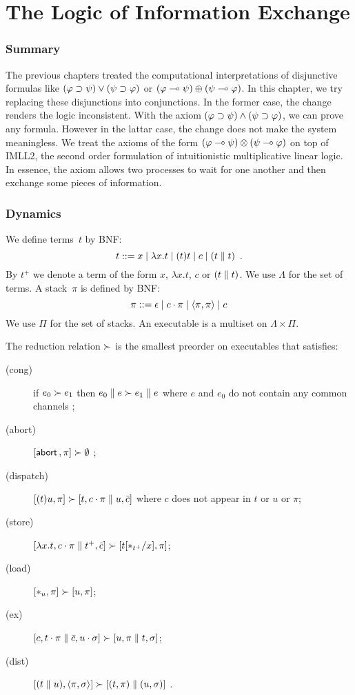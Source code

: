 \chapter{The Logic of Information Exchange}
\label{ch:exchange}

\subsection{Summary}

The previous chapters treated the computational interpretations of
disjunctive formulas like $(\varphi\supset\psi)\lor(\psi\supset\varphi)$ or
$(\varphi\multimap\psi)\oplus(\psi\multimap\varphi)$.  In this chapter, we try
replacing these disjunctions into conjunctions.
In the former case, the change renders the logic inconsistent.
With the axiom $(\varphi\supset\psi)\land(\psi\supset\varphi)$,
we can prove any formula.  However in the lattar case, the change does
not make the system meaningless.  We treat
the axioms of the form $(\varphi\multimap\psi)\otimes(\psi\multimap\varphi)$
on top of IMLL2, the second order formulation of intuitionistic
multiplicative linear
logic.  In essence, the axiom allows two processes to wait for one
another and then exchange some pieces of information.

\subsection{Dynamics}

We define terms~$t$ by BNF:
\[
 t ::= x\mid \lambda x.t\mid (t)t\mid c \mid (t\parallel t)\enspace.
\]
By $t^+$ we denote a term of the form $x$, $\lambda x.t$, $c$ or $(t\parallel
t)$.
We use $\Lambda$ for the set of terms.
A stack~$\pi$ is defined by BNF:
\[
 \pi ::= \epsilon\mid c\cdot\pi \mid \langle{\pi,\pi}\rangle \mid c
\]
We use $\Pi$ for the set of stacks.
An executable is a multiset on $\Lambda\times \Pi$.

The reduction relation $\succ$ is the smallest preorder on executables
that satisfies:
\begin{description}
 \item[(cong)] if
      $e_0         \succ e_1$
      then
      $e_0 \parallel e \succ e_1\parallel e$ where $e$ and $e_0$ do not contain
      any common channels \enspace;
 \item[(abort)] $[\mathsf{abort\,},\pi]\succ \emptyset$ \enspace;
 \item[(dispatch)]
	    $[(t)u, \pi]   \succ [t,c\cdot\pi\parallel u, \bar{c}]$   where $c$
      does not appear in $t$ or $u$ or $\pi$\enspace;
 \item[(store)]
	    $[\lambda x.t,c\cdot\pi \parallel t^+, \bar{c}]
	     \succ
	     [t[\ast_{t^+}/x],      \pi]$\enspace;
 \item[(load)]
	    $[\ast_u,\pi]\succ [u,\pi]$\enspace;
 \item[(ex)]
           $[c, t\cdot\pi\parallel \bar{c},
           u\cdot\sigma] \succ
           [u,\pi\parallel t,\sigma]$\enspace;
 \item[(dist)]
           $[(t\parallel u),\langle{\pi,\sigma}\rangle]  \succ [(t,\pi)\parallel (u,\sigma)]$ \enspace.
\end{description}


